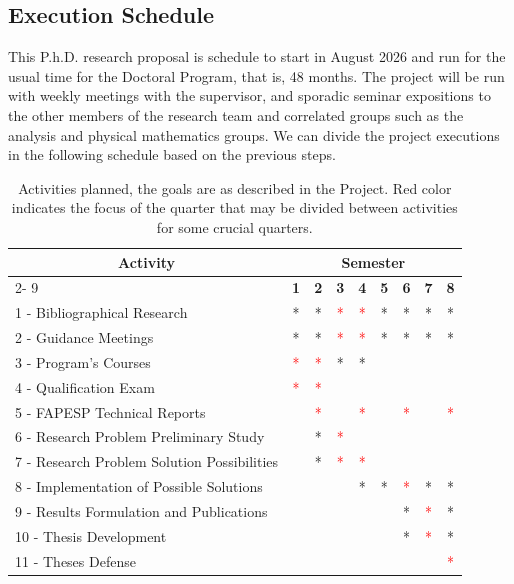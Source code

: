 \subsection{Execution Schedule}

This P.h.D. research proposal is schedule to start in August 2026 and run for the usual time for the Doctoral Program, that is, 48 months. The project will be run with weekly meetings with the supervisor, and sporadic seminar expositions to the other members of the research team and correlated groups such as the analysis and physical mathematics groups. We can divide the project executions in the following schedule based on the previous steps.
\begin{table}[htbp] \centering
	\label{tab:1}
	\begin{tabular}{l|c|c|c|c|c|c|c|c|}
		\hline
		\multicolumn{ 1}{c|}{\textbf{Activity}} & \multicolumn{8}{c|}{\textbf{Semester}} \\ 
		\cline{ 2- 9}
		\multicolumn{ 1}{l|}{} & \textbf{1} & \textbf{2} & \textbf{3} & \textbf{4} & \textbf{5} & \textbf{6} & \textbf{7} & \textbf{8} \\ \hline
		1 - Bibliographical Research & * & * & \textcolor{red}{*} & \textcolor{red}{*} & * &* & * & *  \\ \hline
		2 - Guidance Meetings & * & * & \textcolor{red}{*} & \textcolor{red}{*} & * & * & * & * \\ \hline
		3 - Program's Courses & \textcolor{red}{*} & \textcolor{red}{*} & * & * &  &   &  & \\ \hline
		4 - Qualification Exam &  \textcolor{red}{*}  & \textcolor{red}{*} & & & & & & \\ \hline
	    5 - FAPESP Technical Reports & & \textcolor{red}{*} & & \textcolor{red}{*} & & \textcolor{red}{*} & & \textcolor{red}{*} \\ \hline
		6 - Research Problem Preliminary Study &  & * &  \textcolor{red}{*}  & & & & & \\ \hline
		7 - Research Problem Solution Possibilities &  & * & \textcolor{red}{*} & \textcolor{red}{*} & & & &  \\ \hline
		8 - Implementation of Possible Solutions & & & & * &* & \textcolor{red}{*} & * & * \\ \hline
		9 - Results Formulation and Publications & & & & & & * & \textcolor{red}{*} & * \\ \hline
		10 - Thesis Development & & & & & & * & \textcolor{red}{*} & * \\ \hline
		11 - Theses Defense & & & & & & & & \textcolor{red}{*} \\ \hline
	\end{tabular}
		\caption{Activities planned, the goals are as described in the Project. Red color indicates the focus of the quarter that may be divided between activities for some crucial quarters.}
\end{table}
